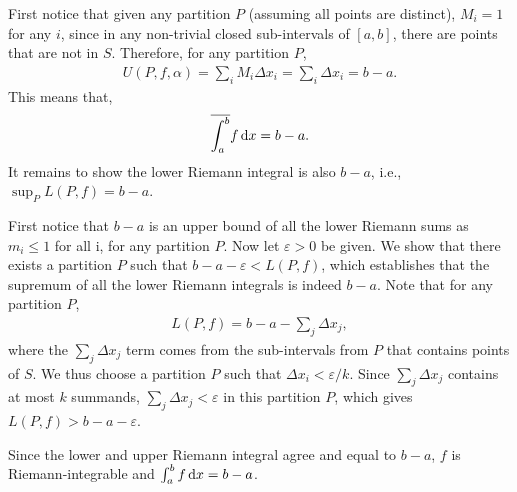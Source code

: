 \documentclass[12pt]{article}
\begin{document}
\begin{fproof}[2]
  First notice that given any partition \(P\) (assuming all points are distinct), \(M_i = 1\) for any \(i\), since in any non-trivial closed sub-intervals of \([a,b]\), there are points that are not in \(S\).
  Therefore, for any partition \(P\),
  \begin{align*}
    U(P, f, \alpha) = \sum_i M_i \Delta x_i = \sum_i \Delta x_i = b - a.
  \end{align*}
  This means that,
  \begin{align*}
    \overline{\int_{a}^{b}} f \mathop{}\!\mathrm{d} x = b - a.
  \end{align*}
  It remains to show the lower Riemann integral is also \(b-a\), 
  i.e., \(\sup_{P} L(P, f) = b-a\).

  First notice that \(b-a\) is an upper bound of all the lower Riemann sums as \(m_i \leq 1\) for all i, for any partition \(P\).
  Now let \(\varepsilon > 0\) be given.
  We show that there exists a partition \(P\) such that \(b-a - \varepsilon < L(P,f)\), which establishes that the supremum of all the lower Riemann integrals is indeed \(b-a\).
  Note that for any partition \(P\),
  \begin{align*}
    L(P,f) = b - a - \sum_j \Delta x_j,
  \end{align*}
  where the \(\sum_j \Delta x_j\) term comes from the sub-intervals from \(P\) that contains points of \(S\).
  We thus choose a partition \(P\) such that \(\Delta x_i < \varepsilon/k\).
  Since \(\sum_j \Delta x_j\) contains at most \(k\) summands, \(\sum_j \Delta x_j < \varepsilon\) in this partition \(P\), which gives \(L(P,f) > b-a-\varepsilon\).

  Since the lower and upper Riemann integral agree and equal to \(b-a\), \(f\) is Riemann-integrable and \(\int_{a}^{b} f \mathop{}\!\mathrm{d} x = b-a\).



\end{fproof}

\newpage
\end{document}
